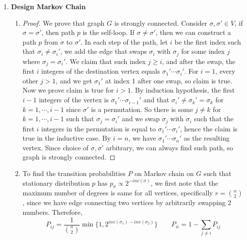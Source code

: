 \documentclass[11pt]{article}
\begin{document}
\renewcommand{\E}[1]{\mathsf{E}\left\{#1\right\}}
\newcommand{\V}[1]{\mathsf{V}\left\{#1\right\}}
\renewcommand{\P}[1]{\mathsf{P}\left(#1\right)}
\newcommand{\abs}[1]{\left|\,#1\,\right|}

\begin{enumerate}
    
\item \textbf{Design Markov Chain}
\begin{enumerate}
\item  
\begin{proof}
    We prove that graph $G$ is strongly connected. Consider $\sigma, \sigma' \in V$, if $\sigma=\sigma'$, then path $p$ is the self-loop. If $\sigma \neq \sigma'$, then we can construct a path $p$ from $\sigma$ to $\sigma'$. In each step of the path, let $i$ be the first index such that $\sigma_i \neq \sigma_i'$, we add the edge that swaps $\sigma_i$ with $\sigma_j$ for some index $j$ where $\sigma_j = \sigma_i'$. We claim that such index $j \geq i$, and after the swap, the first $i$ integers of the destination vertex equals $\sigma_1' \cdots \sigma_i'$. For $i=1$, every other $j > 1$, and we get $\sigma_1'$ at index 1 after one swap, so claim is true. Now we prove claim is true for $i>1$. By induction hypothesis, the first $i-1$ integers of the vertex is $\sigma_1'\cdots \sigma_{i-1}'$ and that $\sigma_i' \neq \sigma_k' = \sigma_k$ for $k=1,\cdots, i-1$ since $\sigma'$ is a permutation. So there is some $j \neq k$ for $k=1,\cdots, i-1$ such that $\sigma_j = \sigma_i'$ and we swap $\sigma_j$ with $\sigma_i$ such that the first $i$ integers in the permutation is equal to $\sigma_1'\cdots \sigma_{i}'$, hence the claim is true in the inductive case. By $i=n$, we have $\sigma_1' \cdots \sigma_n'$ as the resulting vertex. Since choice of $\sigma, \sigma'$ arbitrary, we can always find such path, so graph is strongly connected. 
\end{proof}

\item To find the transition probabilities $P$ on Markov chain on $G$ such that stationary distribution $p$ has $p_{\sigma} \propto 2^{-inv(\sigma)}$, we first note that the maximum number of degrees is same for all vertices, specifically $r=\binom{n}{2}$, since we have edge connecting two vertices by arbitrarily swapping 2 numbers. Therefore, 
\[
    P_{ij} = \frac{1}{\binom{n}{2}} 
    \min \{ 1, 2^{inv(\sigma_1) - inv(\sigma_2)}\}
    \qquad 
    P_{ii} = 1 - \sum_{j\neq i} P_{ij}
\]  
\end{enumerate}
 

\end{enumerate}
\end{document}
